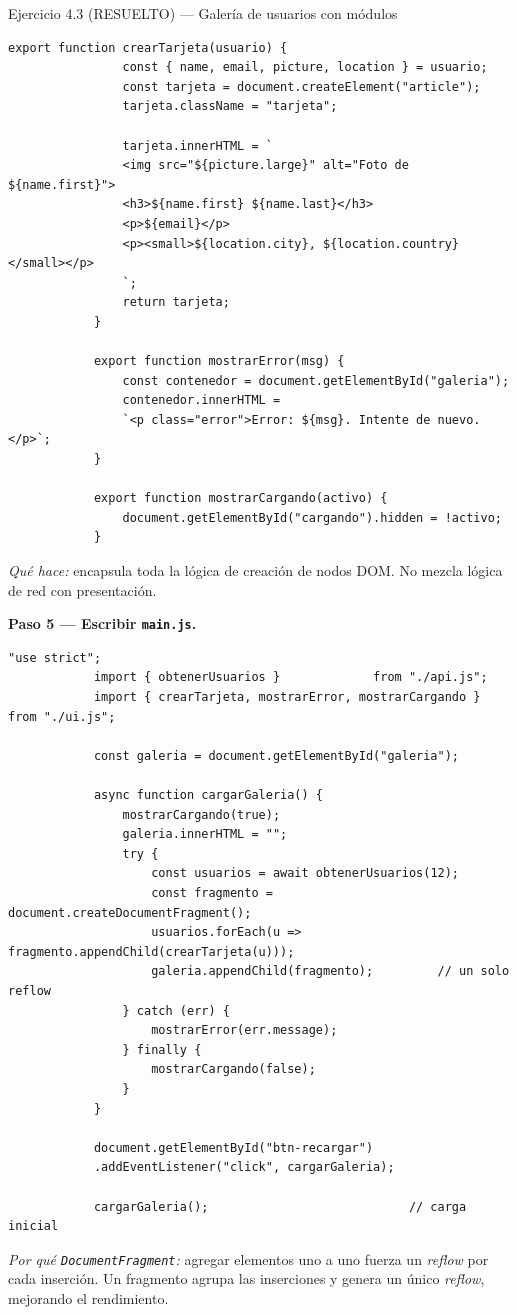 \documentclass[11pt,a4paper,openany]{book}
\begin{document}
\begin{cajaejercicio}{Ejercicio 4.3 (RESUELTO) --- Galería de usuarios con módulos}
\begin{lstlisting}[style=js,caption={src/ui.js},label=lst:4.ej3.ui]
			export function crearTarjeta(usuario) {
				const { name, email, picture, location } = usuario;
				const tarjeta = document.createElement("article");
				tarjeta.className = "tarjeta";
				
				tarjeta.innerHTML = `
				<img src="${picture.large}" alt="Foto de ${name.first}">
				<h3>${name.first} ${name.last}</h3>
				<p>${email}</p>
				<p><small>${location.city}, ${location.country}</small></p>
				`;
				return tarjeta;
			}
			
			export function mostrarError(msg) {
				const contenedor = document.getElementById("galeria");
				contenedor.innerHTML =
				`<p class="error">Error: ${msg}. Intente de nuevo.</p>`;
			}
			
			export function mostrarCargando(activo) {
				document.getElementById("cargando").hidden = !activo;
			}
		\end{lstlisting}
		
		\emph{Qué hace:} encapsula toda la lógica de creación de nodos
		DOM. No mezcla lógica de red con presentación.
		
		\textbf{Paso 5 — Escribir \texttt{main.js}.}
		
		\begin{lstlisting}[style=js,caption={src/main.js},label=lst:4.ej3.main]
			"use strict";
			import { obtenerUsuarios }             from "./api.js";
			import { crearTarjeta, mostrarError, mostrarCargando } from "./ui.js";
			
			const galeria = document.getElementById("galeria");
			
			async function cargarGaleria() {
				mostrarCargando(true);
				galeria.innerHTML = "";
				try {
					const usuarios = await obtenerUsuarios(12);
					const fragmento = document.createDocumentFragment();
					usuarios.forEach(u => fragmento.appendChild(crearTarjeta(u)));
					galeria.appendChild(fragmento);         // un solo reflow
				} catch (err) {
					mostrarError(err.message);
				} finally {
					mostrarCargando(false);
				}
			}
			
			document.getElementById("btn-recargar")
			.addEventListener("click", cargarGaleria);
			
			cargarGaleria();                            // carga inicial
		\end{lstlisting}
		
		\emph{Por qué \texttt{DocumentFragment}:} agregar elementos
		uno a uno fuerza un \emph{reflow} por cada inserción. Un
		fragmento agrupa las inserciones y genera un único \emph{reflow},
		mejorando el rendimiento.
		

\end{cajaejercicio}
\end{document}
